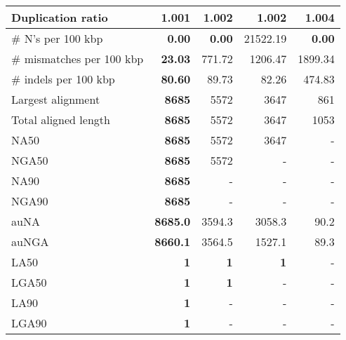 \documentclass[12pt,a4paper]{article}
\begin{document}
\begin{table}[ht]
\begin{center}
\begin{tabular}{|l*{4}{|r}|}
Duplication ratio & {\bf 1.001} & 1.002 & 1.002 & 1.004 \\ \hline
\# N's per 100 kbp & {\bf 0.00} & {\bf 0.00} & 21522.19 & {\bf 0.00} \\ \hline
\# mismatches per 100 kbp & {\bf 23.03} & 771.72 & 1206.47 & 1899.34 \\ \hline
\# indels per 100 kbp & {\bf 80.60} & 89.73 & 82.26 & 474.83 \\ \hline
Largest alignment & {\bf 8685} & 5572 & 3647 & 861 \\ \hline
Total aligned length & {\bf 8685} & 5572 & 3647 & 1053 \\ \hline
NA50 & {\bf 8685} & 5572 & 3647 & - \\ \hline
NGA50 & {\bf 8685} & 5572 & - & - \\ \hline
NA90 & {\bf 8685} & - & - & - \\ \hline
NGA90 & {\bf 8685} & - & - & - \\ \hline
auNA & {\bf 8685.0} & 3594.3 & 3058.3 & 90.2 \\ \hline
auNGA & {\bf 8660.1} & 3564.5 & 1527.1 & 89.3 \\ \hline
LA50 & {\bf 1} & {\bf 1} & {\bf 1} & - \\ \hline
LGA50 & {\bf 1} & {\bf 1} & - & - \\ \hline
LA90 & {\bf 1} & - & - & - \\ \hline
LGA90 & {\bf 1} & - & - & - \\ \hline
\end{tabular}
\end{center}
\end{table}
\end{document}
